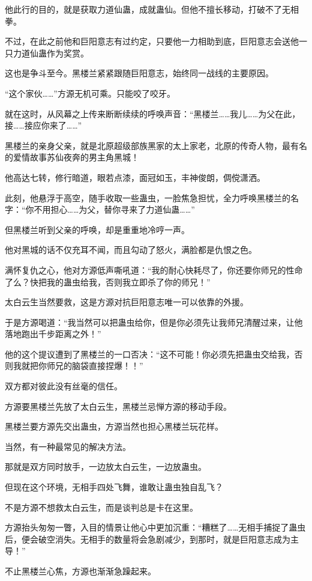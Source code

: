 \begin{this_body}
他此行的目的，就是获取力道仙蛊，成就蛊仙。但他不擅长移动，打破不了无相拳。

不过，在此之前他和巨阳意志有过约定，只要他一力相助到底，巨阳意志会送他一只力道仙蛊作为奖赏。

这也是争斗至今。黑楼兰紧紧跟随巨阳意志，始终同一战线的主要原因。

“这个家伙……”方源无机可乘。只能咬了咬牙。

就在这时，从风幕之上传来断断续续的呼唤声音：“黑楼兰……我儿……为父在此，接……接应你来了……”

黑楼兰的亲身父亲，就是北原超级部族黑家的太上家老，北原的传奇人物，最有名的爱情故事苏仙夜奔的男主角黑城！

他高达七转，修行暗道，眼若点漆，面冠如玉，丰神俊朗，倜傥潇洒。

此刻，他悬浮于高空，随手收取一些蛊虫，一脸焦急担忧，全力呼唤黑楼兰的名字：“你不用担心……为父，替你寻来了力道仙蛊……”

但黑楼兰听到父亲的呼唤，却是重重地冷哼一声。

他对黑城的话不仅充耳不闻，而且勾动了怒火，满脸都是仇恨之色。

满怀复仇之心，他对方源低声嘶吼道：“我的耐心快耗尽了，你还要你师兄的性命了么？快把我的蛊虫给我，否则我立即杀了你的师兄！”

太白云生当然要救，这是方源对抗巨阳意志唯一可以依靠的外援。

于是方源喝道：“我当然可以把蛊虫给你，但是你必须先让我师兄清醒过来，让他落地跑出千步距离之外！”

他的这个提议遭到了黑楼兰的一口否决：“这不可能！你必须先把蛊虫交给我，否则我就把你师兄的脑袋直接捏爆！！”

双方都对彼此没有丝毫的信任。

方源要黑楼兰先放了太白云生，黑楼兰忌惮方源的移动手段。

黑楼兰要方源先交出蛊虫，方源当然也担心黑楼兰玩花样。

当然，有一种最常见的解决方法。

那就是双方同时放手，一边放太白云生，一边放蛊虫。

但现在这个环境，无相手四处飞舞，谁敢让蛊虫独自乱飞？

不是方源不想救太白云生，而是谈判总是卡在这里。

方源抬头匆匆一瞥，入目的情景让他心中更加沉重：“糟糕了……无相手捕捉了蛊虫后，便会破空消失。无相手的数量将会急剧减少，到那时，就是巨阳意志成为主导！”

不止黑楼兰心焦，方源也渐渐急躁起来。


\end{this_body}
